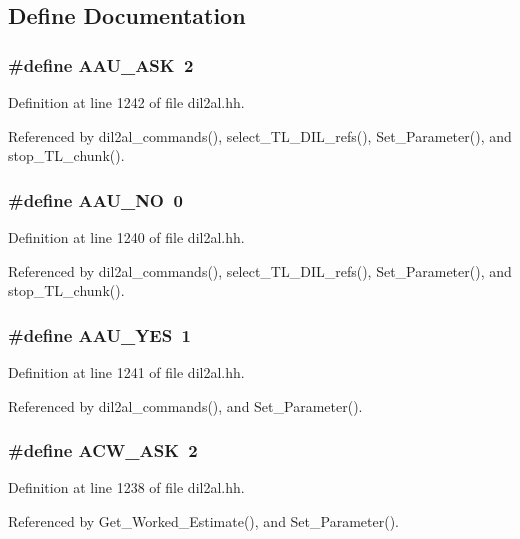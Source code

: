\subsection{Define Documentation}
\subsubsection{\setlength{\rightskip}{0pt plus 5cm}\#define AAU\_\-ASK\ 2}\label{dil2al_8hh_a90}




Definition at line 1242 of file dil2al.hh.

Referenced by dil2al\_\-commands(), select\_\-TL\_\-DIL\_\-refs(), Set\_\-Parameter(), and stop\_\-TL\_\-chunk().
\subsubsection{\setlength{\rightskip}{0pt plus 5cm}\#define AAU\_\-NO\ 0}\label{dil2al_8hh_a88}




Definition at line 1240 of file dil2al.hh.

Referenced by dil2al\_\-commands(), select\_\-TL\_\-DIL\_\-refs(), Set\_\-Parameter(), and stop\_\-TL\_\-chunk().
\subsubsection{\setlength{\rightskip}{0pt plus 5cm}\#define AAU\_\-YES\ 1}\label{dil2al_8hh_a89}




Definition at line 1241 of file dil2al.hh.

Referenced by dil2al\_\-commands(), and Set\_\-Parameter().
\subsubsection{\setlength{\rightskip}{0pt plus 5cm}\#define ACW\_\-ASK\ 2}\label{dil2al_8hh_a87}




Definition at line 1238 of file dil2al.hh.

Referenced by Get\_\-Worked\_\-Estimate(), and Set\_\-Parameter().
